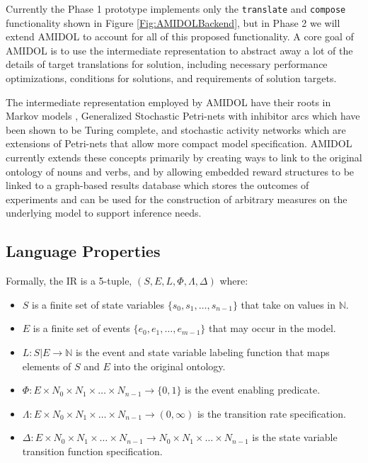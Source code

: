 \documentclass[11pt]{article}
\newcommand{\amidol}{\textsc{AMIDOL}}
\begin{document}
Currently the Phase 1 prototype implements only the \texttt{translate} and \texttt{compose} functionality shown in Figure \ref{Fig:AMIDOLBackend}, but in Phase 2 we will extend \amidol{} to account for all of this proposed functionality.  A core goal of \amidol{} is to use the intermediate representation to abstract away a lot of the details of target translations for solution, including necessary performance optimizations, conditions for solutions, and requirements of solution targets.

The intermediate representation employed by \amidol{} have their roots in Markov models \cite{howard2012dynamic}, Generalized Stochastic Petri-nets with inhibitor arcs \cite{chiola1993generalized} which have been shown to be Turing complete, and stochastic activity networks \cite{movaghar1985performability,sanders2000stochastic} which are extensions of Petri-nets that allow more compact model specification.  \amidol{} currently extends these concepts primarily by creating ways to link to the original ontology of nouns and verbs, and by allowing embedded reward structures to be linked to a graph-based results database which stores the outcomes of experiments and can be used for the construction of arbitrary measures on the underlying model to support inference needs.


\subsection{Language Properties}

Formally, the IR is a 5-tuple, $(S, E, L, \Phi, \Lambda, \Delta)$ where:
\begin{itemize}
\item $S$ is a finite set of state variables $\{s_0, s_1, \ldots, s_{n-1}\}$ that take on values in $\mathbb{N}$.
\item $E$ is a finite set of events $\{e_0, e_1, \ldots, e_{m-1}\}$ that may occur in the model.
\item $L: S|E \rightarrow \mathbb{N}$ is the event and state variable labeling function that maps elements of $S$ and $E$ into the original ontology.
\item $\Phi: E \times N_0 \times N_1 \times \ldots \times N_{n-1} \rightarrow \{0, 1\}$ is the event enabling predicate.
\item $\Lambda: E \times N_0 \times N_1 \times \ldots \times N_{n-1} \rightarrow (0, \infty)$ is the transition rate specification.
\item $\Delta: E \times N_0 \times N_1 \times \ldots \times N_{n-1} \rightarrow N_0 \times N_1 \times \ldots \times N_{n-1}$ is the state variable transition function specification.
\end{itemize}
\end{document}
